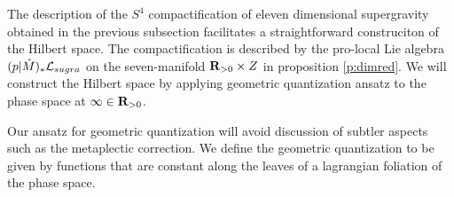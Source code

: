 %
%
%
%
%
\parsec[s:hilbertspace]
The description of the $S^{4}$ compactification of eleven dimensional supergravity obtained in the previous subsection facilitates a straightforward construciton of the Hilbert space. The compactification is described by the pro-local Lie algebra $(p|\mathring M)_{*} \mathcal L_{sugra}$ on the seven-manifold $\mathbf{R}_{>0}\times Z$ in proposition \ref{p:dimred}. We will construct the Hilbert space by applying geometric quantization ansatz to the phase space at $\infty \in \mathbf{R}_{>0}$.

Our ansatz for geometric quantization will avoid discussion of subtler aspects such as the metaplectic correction. We define the geometric quantization to be given by functions that are constant along the leaves of a lagrangian foliation of the phase space.

